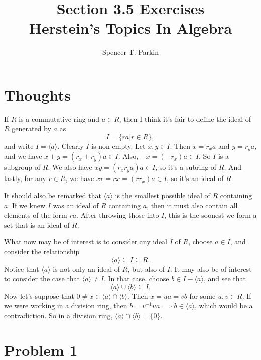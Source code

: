 \documentclass[12pt]{article}
\title{Section 3.5 Exercises\\Herstein's Topics In Algebra}
\author{Spencer T. Parkin}
\begin{document}
\maketitle

\section*{Thoughts}

If $R$ is a commutative ring and $a\in R$, then I think it's fair to define the ideal of $R$ generated by $a$ as
\begin{equation*}
I = \{ra|r\in R\},
\end{equation*}
and write $I=\langle a\rangle$.  Clearly $I$ is non-empty.  Let $x,y\in I$.  Then $x=r_xa$ and $y=r_ya$,
and we have $x+y=(r_x+r_y)a\in I$.  Also, $-x=(-r_x)a\in I$.  So $I$ is a subgroup of $R$.
We also have $xy=(r_xr_ya)a\in I$, so it's a subring of $R$.  And lastly, for any $r\in R$, we have
$xr=rx=(rr_x)a\in I$, so it's an ideal of $R$.

It should also be remarked that $\langle a\rangle$ is the smallest possible ideal of $R$ containing $a$.
If we knew $I$ was an ideal of $R$ containing $a$, then it must also contain all elements of the form $ra$.
After throwing those into $I$, this is the soonest we form a set that is an ideal of $R$.

What now may be of interest is to consider any ideal $I$ of $R$, choose $a\in I$, and consider
the relationship
\begin{equation*}
\langle a\rangle\subseteq I\subseteq R.
\end{equation*}
Notice that $\langle a\rangle$ is not only an ideal of $R$, but also of $I$.
It may also be of interest to consider
the case that $\langle a\rangle\neq I$.  In that case, choose $b\in I-\langle a\rangle$,
and see that
\begin{equation*}
\langle a\rangle\cup\langle b\rangle\subseteq I.
\end{equation*}
Now let's suppose that $0\neq x\in\langle a\rangle\cap\langle b\rangle$.  Then $x=ua=vb$ for some $u,v\in R$.
If we were working in a division ring, then $b=v^{-1}ua\implies b\in\langle a\rangle$, which would be a contradiction.
So in a division ring, $\langle a\rangle\cap\langle b\rangle=\{0\}$.

\section*{Problem 1}
\end{document}
